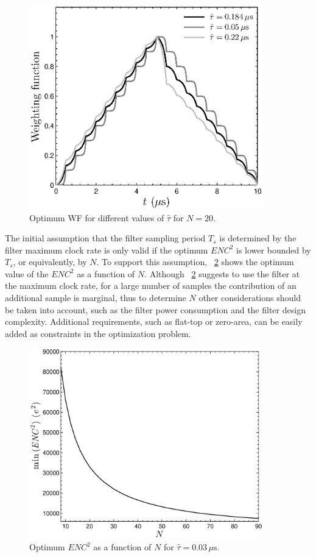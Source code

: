 \begin{figure}[!t]
	\centering
	\includegraphics[width=4in]{./Figures/optimum_wf.eps}
	\caption{Optimum WF for different values of $\hat{\tau}$ for $N=20$.}\label{fig:optimum_wf}
\end{figure}

The initial assumption that the filter sampling period $T_s$ is determined by the filter maximum clock rate is only valid if the optimum $\mathit{ENC}^2$ is lower bounded by $T_s$, or equivalently, by $N$. To support this assumption, \figurename~\ref{fig:optimum_N} shows the optimum value of the $\mathit{ENC}^2$ as a function of $N$. Although \figurename~\ref{fig:optimum_N} suggests to use the filter at the maximum clock rate, for a large number of samples the contribution of an additional sample is marginal, thus to determine $N$ other considerations should be taken into account, such as the filter power consumption and the filter design complexity. Additional requirements, such as \mbox{flat-top} or \mbox{zero-area}, can be easily added as constraints in the optimization problem.

\begin{figure}[!t]
	\centering
	\includegraphics[width=4in]{./Figures/optimum_N.eps}
	\caption{Optimum $\mathit{ENC}^2$ as a function of $N$ for $\hat{\tau} = 0.03\,\mu\text{s}$.}\label{fig:optimum_N}
\end{figure}



